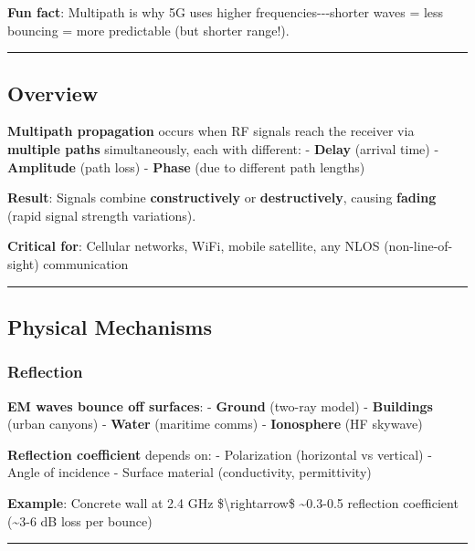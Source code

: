 \textbf{Fun fact}: Multipath is why 5G uses higher
frequencies-\/-\/-shorter waves = less bouncing = more predictable (but
shorter range!).

\begin{center}\rule{0.5\linewidth}{0.5pt}\end{center}

\subsection{Overview}\label{overview}

\textbf{Multipath propagation} occurs when RF signals reach the receiver
via \textbf{multiple paths} simultaneously, each with different: -
\textbf{Delay} (arrival time) - \textbf{Amplitude} (path loss) -
\textbf{Phase} (due to different path lengths)

\textbf{Result}: Signals combine \textbf{constructively} or
\textbf{destructively}, causing \textbf{fading} (rapid signal strength
variations).

\textbf{Critical for}: Cellular networks, WiFi, mobile satellite, any
NLOS (non-line-of-sight) communication

\begin{center}\rule{0.5\linewidth}{0.5pt}\end{center}

\subsection{Physical Mechanisms}\label{physical-mechanisms}

\subsubsection{Reflection}\label{reflection}

\textbf{EM waves bounce off surfaces}: - \textbf{Ground} (two-ray model)
- \textbf{Buildings} (urban canyons) - \textbf{Water} (maritime comms) -
\textbf{Ionosphere} (HF skywave)

\textbf{Reflection coefficient} depends on: - Polarization (horizontal
vs vertical) - Angle of incidence - Surface material (conductivity,
permittivity)

\textbf{Example}: Concrete wall at 2.4 GHz \$\textbackslash rightarrow\$
\textasciitilde0.3-0.5 reflection coefficient (\textasciitilde3-6 dB
loss per bounce)

\begin{center}\rule{0.5\linewidth}{0.5pt}\end{center}

